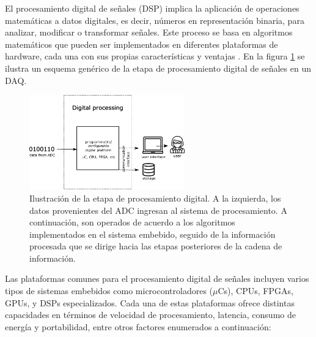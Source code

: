 \documentclass[]{book}
\begin{document}
\noindent El procesamiento digital de señales (DSP) implica la aplicación de operaciones matemáticas a datos digitales, es decir, números en representación binaria, para analizar, modificar o transformar señales. Este proceso se basa en algoritmos matemáticos que pueden ser implementados en diferentes plataformas de hardware, cada una con sus propias características y ventajas \cite{proakis2007digital}. En la figura \ref{fig:digital_stage} se ilustra un esquema genérico de la etapa de procesamiento digital de señales en un DAQ.

\begin{figure}[h]
    \centering
    \includegraphics[width=0.6\textwidth]{digital_stage.png}
    \caption{Ilustración de la etapa de procesamiento digital. A la izquierda, los datos provenientes del ADC ingresan al sistema de procesamiento. A continuación, son operados de acuerdo a los algoritmos implementados en el sistema embebido, seguido de la información procesada que se dirige hacia las etapas posteriores de la cadena de información.}
    \label{fig:digital_stage}

\end{figure}


\noindent Las plataformas comunes para el procesamiento digital de señales incluyen varios tipos de sistemas embebidos como microcontroladores ($\mu$Cs), CPUs, FPGAs, GPUs, y DSPs especializados. Cada una de estas plataformas ofrece distintas capacidades en términos de velocidad de procesamiento, latencia, consumo de energía y portabilidad, entre otros factores enumerados a continuación\cite{meyer2007digital}:
\end{document}
